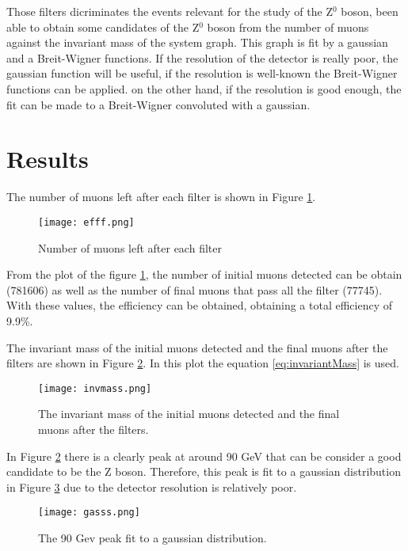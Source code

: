 \documentclass[twoside]{article}
\begin{document}
\begin{multicols}{2}
			Those filters dicriminates the events relevant for the study of the Z$^0$ boson, been able to obtain some candidates of the Z$^0$ boson from the number of muons against the invariant mass of the system graph. This graph is fit by a gaussian and a Breit-Wigner functions. If the resolution of the detector is really poor, the gaussian function will be useful, if the resolution is well-known the Breit-Wigner functions can be applied. on the other hand, if the resolution is good enough, the fit can be made to a Breit-Wigner convoluted with a gaussian.

		\section{Results}

			The number of muons left after each filter is shown in Figure \ref{Img:eff}.

				\begin{figure}[H]
					\centering
					\texttt{[image: efff.png]}
					\caption{\label{Img:eff}Number of muons left after each filter}
				\end{figure}

			From the plot of the figure \ref{Img:eff}, the number of initial muons detected can be obtain (781606) as well as the number of final muons that pass all the filter (77745). With these values, the efficiency can be obtained, obtaining a total efficiency of 9.9\%.

			The invariant mass of the initial muons detected and the final muons after the filters are shown in Figure \ref{Img:invmass}. In this plot the equation \ref{eq:invariantMass} is used.

				\begin{figure}[H]
					\centering
					\texttt{[image: invmass.png]}
					\caption{\label{Img:invmass}The invariant mass of the initial muons detected and the final muons after the filters.}
				\end{figure}

			In Figure \ref{Img:invmass} there is a clearly peak at around 90 GeV that can be consider a good candidate to be the Z boson. Therefore, this peak is fit to a gaussian distribution in Figure \ref{Img:gassss} due to the detector resolution is relatively poor.

				\begin{figure}[H]
					\centering
					\texttt{[image: gasss.png]}
					\caption{\label{Img:gassss}The 90 Gev peak fit to a gaussian distribution.}
				\end{figure}


\end{multicols}
\end{document}
